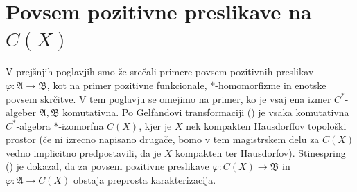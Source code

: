 \section{Povsem pozitivne preslikave na $C(X)$}\label{sec:5}


V prejšnjih poglavjih smo že srečali primere povsem pozitivnih preslikav 
$\varphi: \mathfrak{A} \to \mathfrak{B}$, kot na primer pozitivne funkcionale, $*$-homomorfizme
in enotske povsem skrčitve. V tem poglavju se omejimo na primer, ko je vsaj ena izmer $C^*$-algeber $\mathfrak{A}, \mathfrak{B}$
komutativna. Po Gelfandovi transformaciji (\cite[Theorem VIII.2.1., str. 236]{conway1990}) je vsaka komutativna $C^*$-algebra
$*$-izomorfna $C(X)$, kjer je $X$ nek kompakten Hausdorffov topološki prostor (če ni izrecno napisano drugače,
bomo v tem magistrskem delu za $C(X)$ vedno implicitno predpostavili, da je $X$ kompakten ter Hausdorfov).
Stinespring (\cite{stinespring1955}) je dokazal, da za povsem pozitivne preslikave
$\varphi: C(X) \to \mathfrak{B}$ in $\varphi: \mathfrak{A} \to C(X)$ obstaja preprosta karakterizacija.

